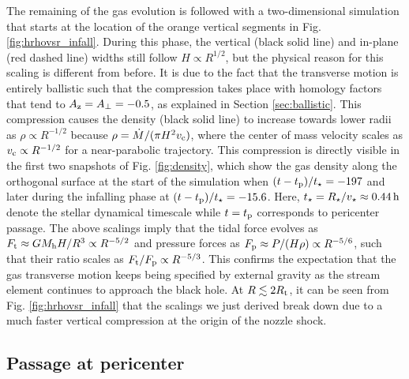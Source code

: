 \documentclass[a4paper,fleqn,usenatbib]{mnras}
\newcommand{\rstar}{R_{\star}}
\newcommand{\rt}{R_{\rm t}}
\newcommand{\mdot}{\dot{M}}
\newcommand{\mh}{M_{\rm h}}
\newcommand{\tp}{t_{\rm p}}
\newcommand{\tstar}{t_{\star}}
\def\hours{\, \rm h}
\begin{document}
The remaining of the gas evolution is followed with a two-dimensional simulation that starts at the location of the orange vertical segments in Fig. \ref{fig:hrhovsr_infall}. During this phase, the vertical (black solid line) and in-plane (red dashed line) widths still follow $H \propto R^{1/2}$, but the physical reason for this scaling is different from before. It is due to the fact that the transverse motion is entirely ballistic such that the compression takes place with homology factors that tend to $A_{\rm z } = A_{\perp} = -0.5$, as explained in Section \ref{sec:ballistic}. This compression causes the density (black solid line) to increase towards lower radii as $\rho \propto R^{-1/2}$ because $\rho = \mdot/(\pi H^2 v_{\rm c})$, where the center of mass velocity scales as $v_{\rm c} \propto R^{-1/2}$ for a near-parabolic trajectory. This compression is directly visible in the first two snapshots of Fig. \ref{fig:density}, which show the gas density along the orthogonal surface at the start of the simulation when $(t-\tp)/\tstar = -197$ and later during the infalling phase at $(t-\tp)/\tstar = -15.6$. Here, $\tstar = \rstar/v_{\star} \approx 0.44 \hours$ denote the stellar dynamical timescale while $t = t_{\rm p}$ corresponds to pericenter passage. The above scalings imply that the tidal force evolves as $F_{\rm t} \approx G \mh H /R^3 \propto R^{-5/2}$ and pressure forces as $F_{\rm p} \approx P / (H \rho) \propto R^{-5/6}$, such that their ratio scales as $F_{\rm t} /F_{\rm p} \propto R^{-5/3}$.  This confirms the expectation that the gas transverse motion keeps being specified by external gravity as the stream element continues to approach the black hole. At $R\lesssim 2 \rt$, it can be seen from Fig. \ref{fig:hrhovsr_infall} that the scalings we just derived break down due to a much faster vertical compression at the origin of the nozzle shock.


\subsection{Passage at pericenter}
\label{sec:pericenter}
\end{document}
